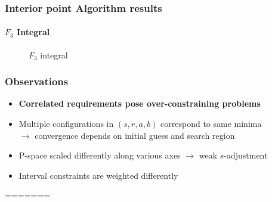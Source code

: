 \documentclass[10pt]{beamer}
\newcommand{\rarrow}{$\rightarrow$ }
\newcommand{\rfn}{\setcounter{footnote}{0}}
\begin{document}
\begin{frame}
\begin{frame}
  \frametitle{Interior point Algorithm results}
  \rfn
  \framesubtitle{$F_3$ Integral}
  \begin{figure}
    \centering
    \label{some example}
    \caption{$F_3$ integral}
  \end{figure}
\end{frame}



\begin{frame}
  \rfn
  \frametitle{Observations}
  \begin{itemize}
    \item \textbf{Correlated requirements pose over-constraining problems}
    \vspace{0.5cm}
    \item Multiple configurations in $(s, r, a, b)$ correspond to same minima\\
      \rarrow convergence depends on initial guess and search region
    \vspace{0.5cm}
    \item P-space scaled differently along various axes \rarrow weak $s$-adjustment
    \vspace{0.5cm}
    \item Interval constraints are weighted differently
  \end{itemize}
=======
\end{frame}


\end{frame}
\end{document}
